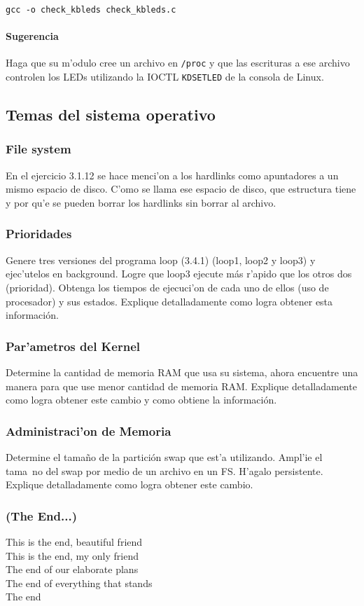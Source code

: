 \texttt{gcc -o check\_kbleds check\_kbleds.c}


\paragraph{Sugerencia}

Haga que su m'odulo cree un archivo en \texttt{/proc} y que las escrituras a ese archivo controlen los LEDs utilizando
la IOCTL \texttt{KDSETLED} de la consola de Linux.

\subsection{Temas del sistema operativo}

\subsubsection{File system}
En el ejercicio 3.1.12 se hace menci'on a los hardlinks como apuntadores a un
mismo espacio de disco. C'omo se llama ese espacio de disco, que estructura
tiene y por qu'e se pueden borrar los hardlinks sin borrar al archivo.

\subsubsection{Prioridades}
Genere tres versiones del programa loop (3.4.1) (loop1, loop2 y loop3) y
ejec'utelos en background. Logre que loop3 ejecute más r'apido que los otros
dos (prioridad). Obtenga los tiempos de ejecuci'on de cada uno de ellos (uso de
procesador) y sus estados. Explique detalladamente como logra obtener esta
información.

\subsubsection{Par'ametros del Kernel}
Determine la cantidad de memoria RAM que usa su sistema, ahora encuentre una
manera para que use menor cantidad de memoria RAM. Explique detalladamente como
logra obtener este cambio y como obtiene la información.

\subsubsection{Administraci'on de Memoria}
Determine el tamaño de la partición swap que est'a utilizando. Ampl'ie el
tama~no del swap por medio de un archivo en un FS. H'agalo persistente.
Explique detalladamente como logra obtener este cambio.

\subsubsection*{(The End...)}

\begin{envRespuesta}
This is the end, beautiful friend\\
This is the end, my only friend\\
The end of our elaborate plans\\
The end of everything that stands\\
The end\\
\end{envRespuesta}


